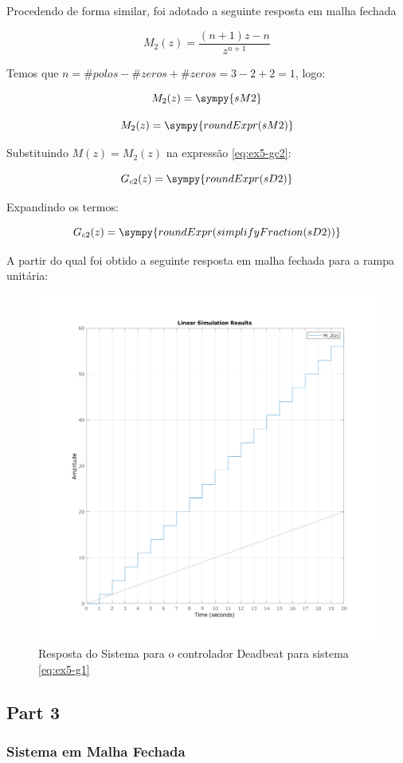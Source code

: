 \documentclass[a4paper,11pt]{article}
\begin{document}
Procedendo de forma similar, foi adotado a seguinte resposta em malha fechada

$$
    M_2(z) = \frac{(n+1)z -n}{z^{n+1}}
$$

Temos que $n = \#polos - \#zeros + \#zeros = 3  - 2 + 2 = 1$, logo:

\begin{equation}\label{eq:ex5-g2}
    M_2(z) = \sympy{sM2}
\end{equation}

$$M_2(z) = \sympy{roundExpr(sM2)}$$

Substituindo $M(z) = M_2(z)$ na expressão \ref{eq:ex5-gc2}:

$$G_{c2}(z) = \sympy{roundExpr(sD2)}$$

Expandindo os termos:

$$G_{c2}(z) = \sympy{roundExpr(simplifyFraction(sD2))}$$

A partir do qual foi obtido a seguinte resposta em malha fechada para a rampa unitária:

\begin{figure}[H]
    \centering
    \includegraphics[width=0.6\linewidth]{img/exsim5-g2-deadbeat-sim.png}
    \caption{Resposta do Sistema para o controlador Deadbeat para sistema \ref{eq:ex5-g1}}
\end{figure}

\subsection{Part 3}

\subsubsection{Sistema em Malha Fechada}
\end{document}
